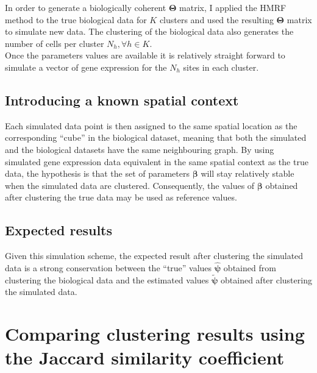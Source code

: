 	In order to generate a biologically coherent $\boldsymbol{\Theta}$ matrix, I applied the HMRF method to the true biological data for $K$ clusters and used the resulting $\boldsymbol{\Theta}$ matrix to simulate new data. The clustering of the biological data also generates the number of cells per cluster $N_h, \forall h \in K$.\\
	
	Once the parameters values are available it is relatively straight forward to simulate a vector of gene expression for the $N_h$ sites in each cluster.
	\subsection{Introducing a known spatial context}\label{subsec:simul_spatial}
	Each simulated data point is then assigned to the same spatial location as the corresponding ``cube'' in the biological dataset, meaning that both the simulated and the biological datasets have the same neighbouring graph. By using simulated gene expression data equivalent in the same spatial context as the true data, the hypothesis is that the set of parameters $\boldsymbol{\beta}$ will stay relatively stable when the simulated data are clustered. Consequently, the values of $\boldsymbol{\beta}$ obtained after clustering the true data may be used as reference values.
	\subsection{Expected results}\label{subsec:expected_simul_results}
	Given this simulation scheme, the expected result after clustering the simulated data is a strong conservation between the ``true'' values $\hat{\boldsymbol{\psi}}$ obtained from clustering the biological data and the estimated values $\widetilde{\boldsymbol{\psi}}$ obtained after clustering the simulated data.\\

\section{Comparing clustering results using the Jaccard similarity coefficient}
